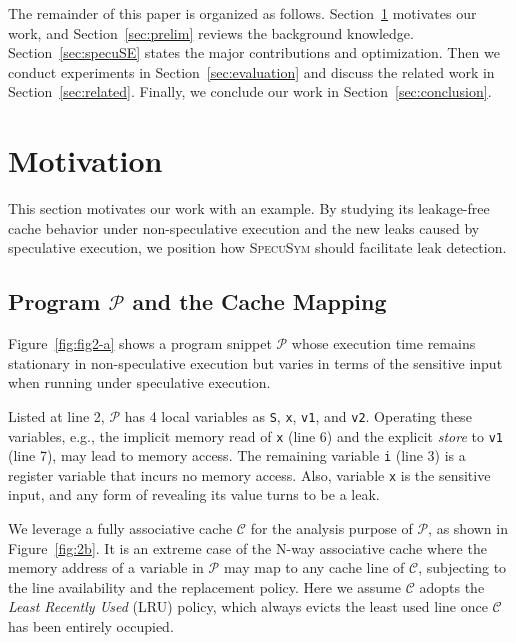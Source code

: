 \documentclass[sigconf]{acmart}
\newcommand{\SpecuSym}{\textsc{SpecuSym} }
\newcommand{\prog}{\mathcal{P}}
\begin{document}
The remainder of this paper is organized as follows. Section~\ref{sec:mtv} 
motivates our work, and Section~\ref{sec:prelim} reviews the background 
knowledge. Section~\ref{sec:specuSE} states the major contributions and
optimization. Then we conduct experiments in Section~\ref{sec:evaluation} 
and discuss the related work in Section~\ref{sec:related}. Finally, we 
conclude our work in Section~\ref{sec:conclusion}.


\section{Motivation}
\label{sec:mtv}

This section motivates our work with an example. By studying its 
leakage-free cache behavior under non-speculative execution and the new 
leaks caused by speculative execution, we position how \SpecuSym should
facilitate leak detection.


\subsection{Program ${\prog}$ and the Cache Mapping}
\label{sec:leak_example}

Figure~\ref{fig:fig2-a} shows a program snippet ${\prog}$ whose execution 
time remains stationary in non-speculative execution but varies in terms
of the sensitive input when running under speculative execution.


Listed at line 2, ${\prog}$ has 4 local variables as \texttt{S}, \texttt{x}, 
\texttt{v1}, and \texttt{v2}. Operating these variables, e.g., the implicit 
memory read of \texttt{x} (line 6) and the explicit \emph{store} to \texttt{v1} 
(line 7), may lead to memory access. The remaining variable \texttt{i} (line 3) 
is a register variable that incurs no memory access. Also, variable \texttt{x} 
is the sensitive input, and any form of revealing its value turns to be a leak. 



We leverage a fully associative cache $\mathcal{C}$ for the analysis purpose 
of $\prog$, as shown in Figure~\ref{fig:2b}. It is an extreme case of the 
N-way associative cache where the memory address of a variable in $\prog$ may 
map to any cache line of $\mathcal{C}$, subjecting to the line availability 
and the replacement policy. Here we assume $\mathcal{C}$ adopts the \emph{Least
Recently Used} (LRU) policy, which always evicts the least used line once 
$\mathcal{C}$ has been entirely occupied.
\end{document}
